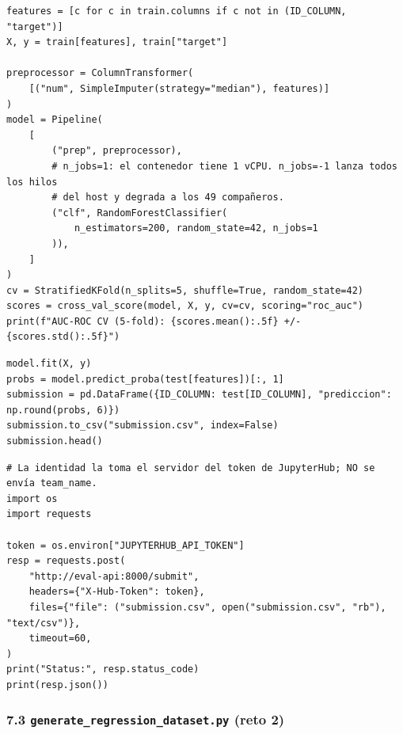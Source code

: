 \documentclass[11pt,a4paper]{article}
\begin{document}
\begin{lstlisting}
features = [c for c in train.columns if c not in (ID_COLUMN, "target")]
X, y = train[features], train["target"]

preprocessor = ColumnTransformer(
    [("num", SimpleImputer(strategy="median"), features)]
)
model = Pipeline(
    [
        ("prep", preprocessor),
        # n_jobs=1: el contenedor tiene 1 vCPU. n_jobs=-1 lanza todos los hilos
        # del host y degrada a los 49 compañeros.
        ("clf", RandomForestClassifier(
            n_estimators=200, random_state=42, n_jobs=1
        )),
    ]
)
cv = StratifiedKFold(n_splits=5, shuffle=True, random_state=42)
scores = cross_val_score(model, X, y, cv=cv, scoring="roc_auc")
print(f"AUC-ROC CV (5-fold): {scores.mean():.5f} +/- {scores.std():.5f}")
\end{lstlisting}

\begin{lstlisting}
model.fit(X, y)
probs = model.predict_proba(test[features])[:, 1]
submission = pd.DataFrame({ID_COLUMN: test[ID_COLUMN], "prediccion": np.round(probs, 6)})
submission.to_csv("submission.csv", index=False)
submission.head()
\end{lstlisting}

\begin{lstlisting}
# La identidad la toma el servidor del token de JupyterHub; NO se envía team_name.
import os
import requests

token = os.environ["JUPYTERHUB_API_TOKEN"]
resp = requests.post(
    "http://eval-api:8000/submit",
    headers={"X-Hub-Token": token},
    files={"file": ("submission.csv", open("submission.csv", "rb"), "text/csv")},
    timeout=60,
)
print("Status:", resp.status_code)
print(resp.json())
\end{lstlisting}

\hypertarget{73-generate_regression_datasetpy-reto-2}{%
\subsubsection{\texorpdfstring{7.3 \texttt{generate\_\allowbreak{}regression\_\allowbreak{}dataset.\allowbreak{}py} (reto 2)}{7.3 generate\_regression\_dataset.py (reto 2)}}\label{73-generate_regression_datasetpy-reto-2}}
\end{document}
